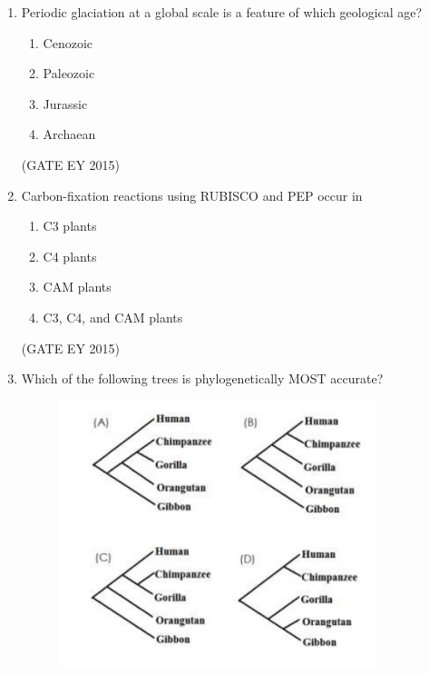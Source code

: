 \documentclass[journal,12pt,onecolumn]{IEEEtran}
\theoremstyle{remark}
\begin{document}
\begin{enumerate}
\begin{multicols}{2}
\begin{enumerate}
    
\item P, Q, and R
\item P and R
\item S and T
\item P, Q, and T

    \end{enumerate}
    \end{multicols}
\hfill{(GATE EY 2015)}
\item 
Periodic glaciation at a global scale is a feature of which geological age?

\begin{multicols}{4}
\begin{enumerate}
    
\item Cenozoic
\item Paleozoic
\item Jurassic
\item Archaean

    \end{enumerate}
    \end{multicols}
\hfill{(GATE EY 2015)}

\item Carbon-fixation reactions using RUBISCO and PEP occur in


\begin{multicols}{2}
\begin{enumerate}
    
\item C3 plants
\item C4 plants
\item CAM plants
\item C3, C4, and CAM plants

    \end{enumerate}
    \end{multicols}
\hfill{(GATE EY 2015)}
\item 
Which of the following trees is phylogenetically MOST accurate?


\begin{figure}[H]
    \centering
    \includegraphics[]{figs/O.21.png}
    \caption{}
    \label{fig:2}
\end{figure}
   

\end{enumerate}
\end{document}
